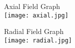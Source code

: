 \begin{minipage}{\textwidth}
    \centering
    
    \begin{minipage}{.4\textwidth}
        \centering
        Axial Field Graph \\
        
        \texttt{[image: axial.jpg]}
    \end{minipage}

    \begin{minipage}{.4\textwidth}
        \centering
        Radial Field Graph \\
        
        \texttt{[image: radial.jpg]}
    \end{minipage}

\end{minipage}